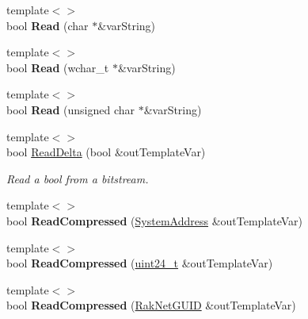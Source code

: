 \begin{DoxyCompactItemize}
\item 
\hypertarget{class_rak_net_1_1_bit_stream_aee31265ab3c6a67a08cec35d8651da91}{{\footnotesize template$<$$>$ }\\bool {\bfseries Read} (char $\ast$\&var\-String)}\label{class_rak_net_1_1_bit_stream_aee31265ab3c6a67a08cec35d8651da91}

\item 
\hypertarget{class_rak_net_1_1_bit_stream_a2f2af6526f4b7f801631d947101f4c7a}{{\footnotesize template$<$$>$ }\\bool {\bfseries Read} (wchar\-\_\-t $\ast$\&var\-String)}\label{class_rak_net_1_1_bit_stream_a2f2af6526f4b7f801631d947101f4c7a}

\item 
\hypertarget{class_rak_net_1_1_bit_stream_af05a8a51a4119ca9e9a584686ae2e42d}{{\footnotesize template$<$$>$ }\\bool {\bfseries Read} (unsigned char $\ast$\&var\-String)}\label{class_rak_net_1_1_bit_stream_af05a8a51a4119ca9e9a584686ae2e42d}

\item 
{\footnotesize template$<$$>$ }\\bool \hyperlink{class_rak_net_1_1_bit_stream_a377a1aa3f331581e613f6a504ffdd284}{Read\-Delta} (bool \&out\-Template\-Var)
\begin{DoxyCompactList}\small\item\em Read a bool from a bitstream. \end{DoxyCompactList}\item 
\hypertarget{class_rak_net_1_1_bit_stream_a3d78522d7987e8a59f7f9e5c622fbb32}{{\footnotesize template$<$$>$ }\\bool {\bfseries Read\-Compressed} (\hyperlink{struct_rak_net_1_1_system_address}{System\-Address} \&out\-Template\-Var)}\label{class_rak_net_1_1_bit_stream_a3d78522d7987e8a59f7f9e5c622fbb32}

\item 
\hypertarget{class_rak_net_1_1_bit_stream_ad8ad611671bd37a54576ec2a1da6f89c}{{\footnotesize template$<$$>$ }\\bool {\bfseries Read\-Compressed} (\hyperlink{struct_rak_net_1_1uint24__t}{uint24\-\_\-t} \&out\-Template\-Var)}\label{class_rak_net_1_1_bit_stream_ad8ad611671bd37a54576ec2a1da6f89c}

\item 
\hypertarget{class_rak_net_1_1_bit_stream_abb266951a5482280e93232d2a810237f}{{\footnotesize template$<$$>$ }\\bool {\bfseries Read\-Compressed} (\hyperlink{struct_rak_net_1_1_rak_net_g_u_i_d}{Rak\-Net\-G\-U\-I\-D} \&out\-Template\-Var)}\label{class_rak_net_1_1_bit_stream_abb266951a5482280e93232d2a810237f}


\end{DoxyCompactItemize}
